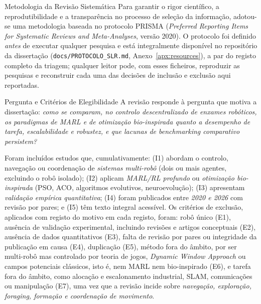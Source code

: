 \documentclass[12pt,reqno, twoside]{amsbook}
\makeatletter
\def\section{\@startsection{section}{1}%
      \z@{.5\linespacing\@plus.7\linespacing}{.25\linespacing}%
      {\normalfont\bfseries\flushleft}}
\def\subsection{\@startsection{subsection}{2}%
      \z@{.5\linespacing\@plus.7\linespacing}{.25\linespacing}%
      {\normalfont\bfseries\flushleft}}
\theoremstyle{plain}
\numberwithin{equation}{chapter}
\numberwithin{section}{chapter}
\numberwithin{table}{chapter}
\numberwithin{figure}{chapter}
\makeatother
\begin{document}
\section{Metodologia da Revisão Sistemática}
\label{sec:slr_metodologia}
Para garantir o rigor científico, a reprodutibilidade e a transparência no processo de seleção da informação, adotou-se uma metodologia baseada no protocolo PRISMA (\textit{Preferred Reporting Items for Systematic Reviews and Meta-Analyses}, versão 2020). O protocolo foi definido \emph{antes} de executar qualquer pesquisa e está integralmente disponível no repositório da dissertação (\texttt{docs/PROTOCOLO\_SLR.md}, Anexo~\ref{apx:resources}), a par do registo completo da triagem; qualquer leitor pode, com esses ficheiros, reproduzir as pesquisas e reconstruir cada uma das decisões de inclusão e exclusão aqui reportadas.

\subsection{Pergunta e Critérios de Elegibilidade}
A revisão responde à pergunta que motiva a dissertação: \emph{como se comparam, no controlo descentralizado de enxames robóticos, os paradigmas de MARL e de otimização bio-inspirada quanto a desempenho de tarefa, escalabilidade e robustez, e que lacunas de \textit{benchmarking} comparativo persistem?}

Foram incluídos estudos que, cumulativamente: (I1) abordam o controlo, navegação ou coordenação de \emph{sistemas multi-robô} (dois ou mais agentes, excluindo o robô isolado); (I2) aplicam \emph{MARL/RL profundo} ou \emph{otimização bio-inspirada} (PSO, ACO, algoritmos evolutivos, neuroevolução); (I3) apresentam \emph{validação empírica quantitativa}; (I4) foram publicados entre \emph{2020 e 2026} com revisão por pares; e (I5) têm texto integral acessível. Os critérios de exclusão, aplicados com registo do motivo em cada registo, foram: robô único (E1), ausência de validação experimental, incluindo revisões e artigos conceptuais (E2), ausência de dados quantitativos (E3), falta de revisão por pares ou integridade da publicação em causa (E4), duplicação (E5), método fora do âmbito, por ser multi-robô mas controlado por teoria de jogos, \textit{Dynamic Window Approach} ou campos potenciais clássicos, isto é, nem MARL nem bio-inspirado (E6), e tarefa fora do âmbito, como alocação e escalonamento industrial, SLAM, comunicações ou manipulação (E7), uma vez que a revisão incide sobre \emph{navegação, exploração, \emph{foraging}, formação e coordenação de movimento}.
\end{document}
